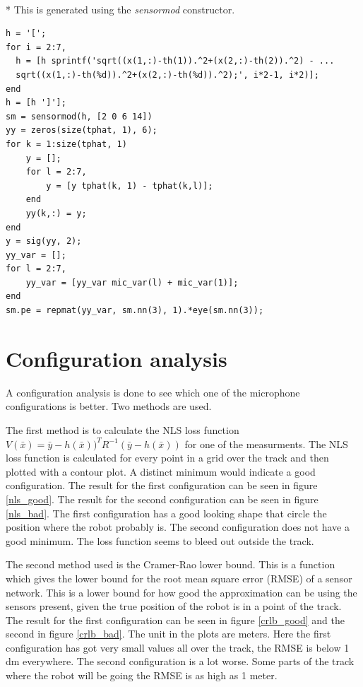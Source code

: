 \documentclass[10pt,a4paper]{report}
\begin{document}
\\*
This is generated using the \emph{sensormod} constructor.
\begin{verbatim}
h = '[';
for i = 2:7,
  h = [h sprintf('sqrt((x(1,:)-th(1)).^2+(x(2,:)-th(2)).^2) - ...
  sqrt((x(1,:)-th(%d)).^2+(x(2,:)-th(%d)).^2);', i*2-1, i*2)];
end
h = [h ']'];
sm = sensormod(h, [2 0 6 14])
yy = zeros(size(tphat, 1), 6);
for k = 1:size(tphat, 1)
    y = [];
    for l = 2:7,
        y = [y tphat(k, 1) - tphat(k,l)];
    end
    yy(k,:) = y;
end
y = sig(yy, 2);
yy_var = [];
for l = 2:7,
    yy_var = [yy_var mic_var(l) + mic_var(1)];
end
sm.pe = repmat(yy_var, sm.nn(3), 1).*eye(sm.nn(3));
\end{verbatim}



\newpage
\section{Configuration analysis}
\label{Configuration analysis}
A configuration analysis is done to see which one of the microphone configurations is better.
Two methods are used.

The first method is to calculate the NLS loss function $V(\bar{x}) = \bar{y} - h(\bar{x}))^TR^{-1}(\bar{y} - h(\bar{x}))$ for one of the measurments.
The NLS loss function is calculated for every point in a grid over the track and then plotted with a contour plot.
A distinct minimum would indicate a good configuration.
The result for the first configuration can be seen in figure \ref{nls_good}.
The result for the second configuration can be seen in figure \ref{nls_bad}.
The first configuration has a good looking shape that circle the position where the robot probably is.
The second configuration does not have a good minimum. The loss function seems to bleed out outside the track.

The second method used is the Cramer-Rao lower bound. This is a function which gives the lower bound for the root mean square error (RMSE) of a sensor network.
This is a lower bound for how good the approximation can be using the sensors present, given the true position of the robot is in a point of the track.
The result for the first configuration can be seen in figure \ref{crlb_good} and the second in figure \ref{crlb_bad}.
The unit in the plots are meters.
Here the first configuration has got very small values all over the track, the RMSE is below 1 dm everywhere.
The second configuration is a lot worse. Some parts of the track where the robot will be going the RMSE is as high as 1 meter.
\end{document}
